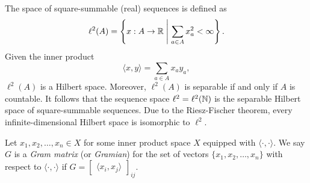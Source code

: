 \begin{example}
    \cite{rudin1987real} %
    The space of square-summable (real) sequences is defined as
    \begin{equation}
        \label{eqn:l2-space}
        \ell^2(A) = \left\{
            x : A \to \mathbb{R} \;\middle\vert\; \sum_{a \in A} x_a^2 < \infty
        \right\}.
    \end{equation}
    Given the inner product
    \begin{equation}
        \label{eqn:l2-inner-product}
        \langle x, y \rangle = \sum_{a \in A} x_a y_a,
    \end{equation}
    \(\ell^2(A)\) is a Hilbert space.
    Moreover, \(\ell^2(A)\) is separable if and only if \(A\) is countable.
    It follows that the sequence space \(\ell^2 = \ell^2(\mathbb{N})\) is the separable Hilbert space of square-summable sequences.
    Due to the Riesz-Fischer theorem, every infinite-dimensional Hilbert space is isomorphic to \(\ell^2\).
\end{example}

\begin{definition}
    \cite{horn2013matrix}
    Let \(x_1, x_2, \dots, x_n \in X\) for some inner product space \(X\) equipped with \(\langle \cdot, \cdot \rangle\).
    We say \(G\) is a \textit{Gram matrix} (or \textit{Gramian}) for the set of vectors \(\{x_1, x_2, \dots, x_n\}\) with respect to \(\langle \cdot, \cdot \rangle\) if \(G = \begin{bmatrix}
        \langle x_i, x_j \rangle
    \end{bmatrix}_{ij}\).
\end{definition}

